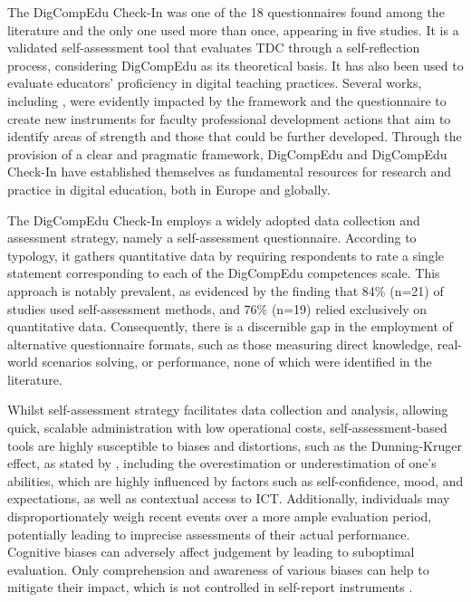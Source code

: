\documentclass[english]{textolivre}
\begin{document}
The DigCompEdu Check-In was one of the 18 questionnaires found among the literature and the only one used more than once, appearing in five studies. It is a validated self-assessment tool that evaluates TDC through a self-reflection process, considering DigCompEdu as its theoretical basis. It has also been used to evaluate educators’ proficiency in digital teaching practices. Several works, including \textcite{EsteveMon2022,moreira2023digital,muammar2023evaluation,nunezcanal2022new}, were evidently impacted by the framework and the questionnaire to create new instruments for faculty professional development actions that aim to identify areas of strength and those that could be further developed. Through the provision of a clear and pragmatic framework, DigCompEdu and DigCompEdu Check-In have established themselves as fundamental resources for research and practice in digital education, both in Europe and globally.

The DigCompEdu Check-In employs a widely adopted data collection and assessment strategy, namely a self-assessment questionnaire. According to  typology, it gathers quantitative data by requiring respondents to rate a single statement corresponding to each of the DigCompEdu competences scale. This approach is notably prevalent, as evidenced by the finding that 84\% (n=21) of studies used self-assessment methods, and 76\% (n=19) relied exclusively on quantitative data. Consequently, there is a discernible gap in the employment of alternative questionnaire formats, such as those measuring direct knowledge, real-world scenarios solving, or performance, none of which were identified in the literature.

Whilst self-assessment strategy facilitates data collection and analysis, allowing quick, scalable administration with low operational costs, self-assessment-based tools are highly susceptible to biases and distortions, such as the Dunning-Kruger effect, as stated by \textcite{mahmood2016dunning}, including the overestimation or underestimation of one’s abilities, which are highly influenced by factors such as self-confidence, mood, and expectations, as well as contextual access to ICT. Additionally, individuals may disproportionately weigh recent events over a more ample evaluation period, potentially leading to imprecise assessments of their actual performance. Cognitive biases can adversely affect judgement by leading to suboptimal evaluation. Only comprehension and awareness of various biases can help to mitigate their impact, which is not controlled in self-report instruments \cite{Friedman2017}.
\end{document}
